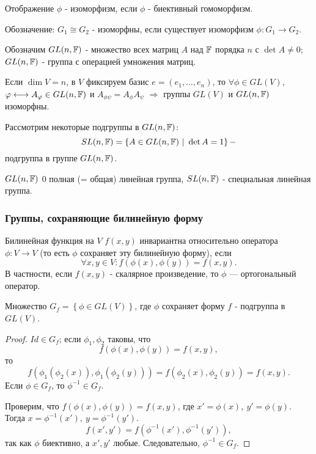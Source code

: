 \begin{definition}
    Отображение $\phi$ - изоморфизм, если $\phi$ - биективный гомоморфизм.
\end{definition} 

Обозначение: $G_1 \cong G_2$ - изоморфны, если существует изоморфизм $\phi: G_1 \to G_2$.

\begin{example1}
    Обозначим $GL(n, \mathbb{F})$ - множество всех матриц $A$ над $\mathbb{F}$ порядка $n$ с $\det{A} \neq 0$; $GL(n, \mathbb{F})$ - группа с операцией умножения матриц.

    Если $\dim{V} = n$, в $V$ фиксируем базис $e = (e_1, \dots, e_n)$, то $\forall \phi \in GL(V)$, $\varphi \longleftrightarrow A_{\varphi} \in GL(n, \mathbb{F})$ и $A_{\phi \psi} = A_{\phi}A_{\psi}$ $\Longrightarrow$ группы $GL(V)$ и $GL(n, \mathbb{F})$ изоморфны.

    Рассмотрим некоторые подгруппы в $GL(n, \mathbb{F})$:
    \[SL(n, \mathbb{F}) = \left\{A \in GL(n, \mathbb{F}) \ | \ \det{A} = 1\right\} - \]
    подгруппа  в группе $GL(n, \mathbb{F})$.

    $GL(n, \mathbb{F})$ 0 полная (= общая) линейная группа, $SL(n, \mathbb{F})$ - специальная линейная группа.
\end{example1}


\subsubsection*{Группы, сохраняющие билинейную форму}
\begin{definition}
    Билинейная функция на $V$ $f(x,y)$ инвариантна относительно оператора $\phi: V \to V$ (то есть $\phi$ сохраняет эту билинейную форму), если \[\forall x, y \in V: f(\phi(x), \phi(y)) = f(x,y).\]
    В частности, если $f(x,y)$ - скалярное произведение, то $\phi$ — ортогональный оператор.
\end{definition} 

\begin{lemma}
    Множество $G_f = \left\{\phi \in GL(V)\right\}$, где $\phi$ сохраняет форму $f$ - подгруппа в $GL(V)$.
\end{lemma} 
\begin{proof}
    $Id \in G_f$; если $\phi_1, \phi_2$ таковы, что 
    \[f(\phi(x), \phi(y)) = f(x,y),\]
    то 
    \[f(\phi_1(\phi_2(x)), \phi_1(\phi_2(y))) = f(\phi_2(x), \phi_2(y)) = f(x,y).\]
    Если $\phi \in G_f$, то $\phi^{-1} \in G_f$.

    Проверим, что $f(\phi(x), \phi(y)) = f(x,y)$, где $x' = \phi(x), \ y' = \phi(y)$. Тогда $x = \phi^{-1}(x'), \ y = \phi^{-1}(y')$.
    \[f(x',y') = f(\phi^{-1}(x'), \phi^{-1}(y')),\]
    так как $\phi$ биективно, а $x',y'$ любые. Следовательно, $\phi^{-1} \in G_f$.
\end{proof} 

